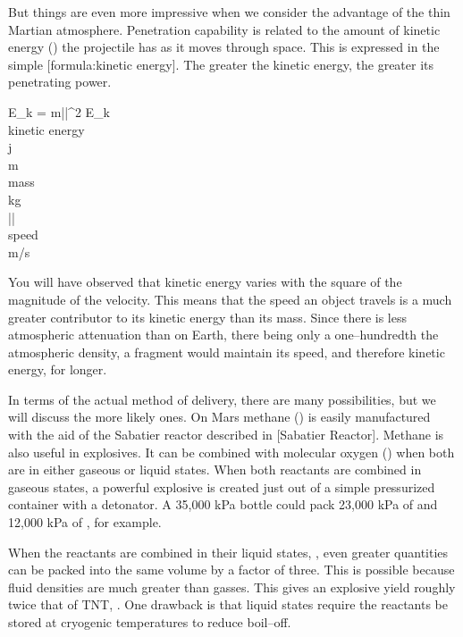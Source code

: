 But things are even more impressive when we consider the advantage of the thin Martian atmosphere. Penetration capability is related to the amount of kinetic energy () the projectile has as it moves through space. This is expressed in the simple [formula:kinetic energy]. The greater the kinetic energy, the greater its penetrating power.

\crlf
{}
\startformula
E_k =  m||^{2}
\stopformula
\startlegend
\leg E_k \\ kinetic energy \\ j \\
\leg m \\ mass \\ kg \\
\leg || \\ speed \\ m/s \\
\stoplegend
\crlf

You will have observed that kinetic energy varies with the square of the magnitude of the velocity. This means that the speed an object travels is a much greater contributor to its kinetic energy than its mass. Since there is less atmospheric attenuation than on Earth, there being only a one--hundredth the atmospheric density, a fragment would maintain its speed, and therefore kinetic energy, for longer.

In terms of the actual method of delivery, there are many possibilities, but we will discuss the more likely ones. On Mars methane () is easily manufactured with the aid of the Sabatier reactor described in [Sabatier Reactor]. Methane is also useful in explosives. It can be combined with molecular oxygen () when both are in either gaseous or liquid states. When both reactants are combined in gaseous states, a powerful explosive is created just out of a simple pressurized container with a detonator. A 35,000 kPa bottle could pack 23,000 kPa of  and 12,000 kPa of , for example.

When the reactants are combined in their liquid states, , even greater quantities can be packed into the same volume by a factor of three. This is possible because fluid densities are much greater than gasses. This gives an explosive yield roughly twice that of TNT, . One drawback is that liquid states require the reactants be stored at cryogenic temperatures to reduce boil--off.

